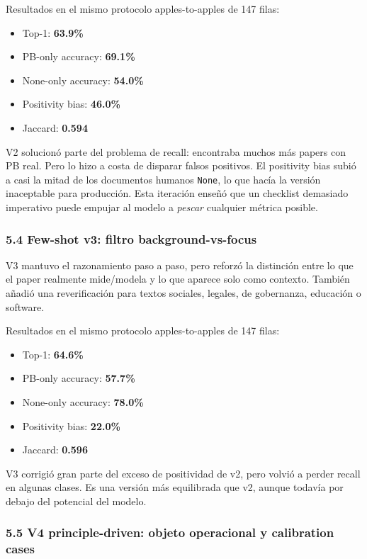 Resultados en el mismo protocolo apples-to-apples de 147 filas:

\begin{itemize}
\item Top-1: \textbf{63.9\%}
\item PB-only accuracy: \textbf{69.1\%}
\item None-only accuracy: \textbf{54.0\%}
\item Positivity bias: \textbf{46.0\%}
\item Jaccard: \textbf{0.594}
\end{itemize}

V2 solucionó parte del problema de recall: encontraba muchos más papers con PB real. Pero lo hizo a costa de disparar falsos positivos. El positivity bias subió a casi la mitad de los documentos humanos \texttt{None}, lo que hacía la versión inaceptable para producción. Esta iteración enseñó que un checklist demasiado imperativo puede empujar al modelo a \emph{pescar} cualquier métrica posible.

\subsubsection{5.4 Few-shot v3: filtro background-vs-focus}

V3 mantuvo el razonamiento paso a paso, pero reforzó la distinción entre lo que el paper realmente mide/modela y lo que aparece solo como contexto. También añadió una reverificación para textos sociales, legales, de gobernanza, educación o software.

Resultados en el mismo protocolo apples-to-apples de 147 filas:

\begin{itemize}
\item Top-1: \textbf{64.6\%}
\item PB-only accuracy: \textbf{57.7\%}
\item None-only accuracy: \textbf{78.0\%}
\item Positivity bias: \textbf{22.0\%}
\item Jaccard: \textbf{0.596}
\end{itemize}

V3 corrigió gran parte del exceso de positividad de v2, pero volvió a perder recall en algunas clases. Es una versión más equilibrada que v2, aunque todavía por debajo del potencial del modelo.

\subsubsection{5.5 V4 principle-driven: objeto operacional y calibration cases}


